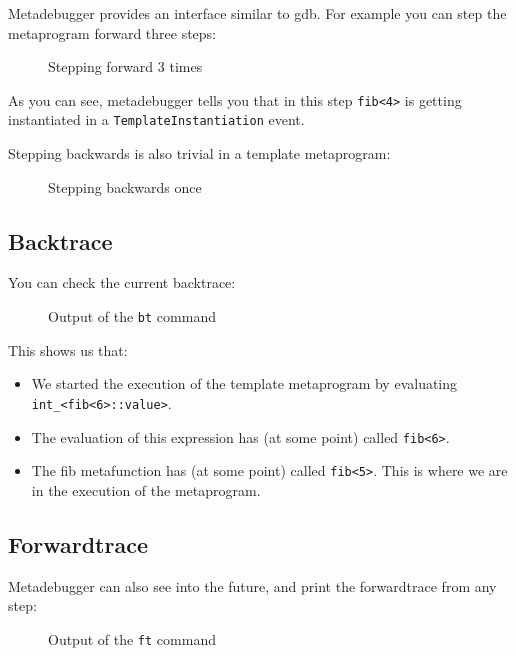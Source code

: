 Metadebugger provides an interface similar to gdb\cite{gdb}. For example you
can step the metaprogram forward three steps:

\begin{figure}[H]
    
    \caption{Stepping forward 3 times}
\end{figure}

\noindent
As you can see, metadebugger tells you that in this step \texttt{fib<4>} is
getting instantiated in a \texttt{TemplateInstantiation} event.

Stepping backwards is also trivial in a template metaprogram:

\begin{figure}[H]
    
    \caption{Stepping backwards once}
\end{figure}

\subsection{Backtrace}

You can check the current backtrace:

\begin{figure}[H]
    
    \caption{Output of the \texttt{bt} command}
\end{figure}

\noindent
This shows us that:

\begin{itemize}
    \item
        We started the execution of the template metaprogram by evaluating \\
        \texttt{int\_<fib<6>::value>}.
    \item
        The evaluation of this expression has (at some point) called
        \texttt{fib<6>}.
    \item
        The fib metafunction has (at some point) called \texttt{fib<5>}.
        This is where we are in the execution of the metaprogram.
\end{itemize}

\subsection{Forwardtrace}

Metadebugger can also see into the future, and print the forwardtrace from any
step:

\begin{figure}[H]
    
    \caption{Output of the \texttt{ft} command}
\end{figure}

